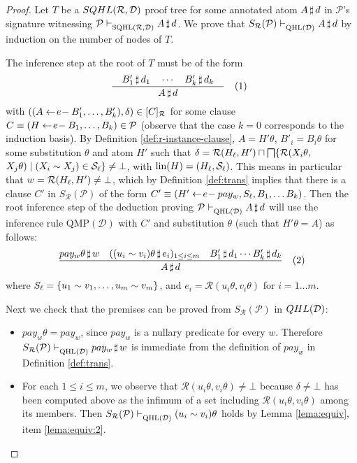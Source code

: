 \documentclass{sigplanconf}
\newcommand{\qdom}{\mathcal{D}} \newcommand{\dqdom}{D \setminus \{\bot\}} \newcommand{\bqdom}{(D \setminus \{\bot\}) \uplus \{?\}}
\newcommand{\Set}{\mathcal{S}}
\newcommand{\simrel}{\mathcal{R}}
\newcommand{\trans}[2]{S_{#1}(#2)}
\newcommand{\Prog}{\mathcal{P}} \newcommand{\UProg}{\mathcal{P_U}}
\theoremstyle{definition}
\theoremstyle{plain}
\begin{document}
\begin{proof}
Let $T$ be a $\sqhl{\simrel}{\qdom}$ proof tree for some annotated atom $A\,\sharp\,d$ in $\Prog$'s signature witnessing $\Prog \sqhlrd \at{A}{d}$. We prove that $\trans{\simrel}{\Prog} \qhld \at{A}{d}$ by induction on the number of nodes of $T$.

The inference step at the root of $T$  must be of the form
\[
    \frac
    {\quad B'_{1}\,\sharp\,d_{1} \quad \cdots \quad B'_{k}\,\sharp\,d_{k} \quad}
    {A\,\sharp\,d} \quad \mbox{(1)} \enspace
\]
with $((A \qgets{e} B'_1, \ldots, B'_k), \delta) \in [C]_\simrel$ for some clause $C \equiv (H \qgets{e} B_1, \ldots, B_k)  \in \Prog$ (observe that the case $k=0$ corresponds to the induction basis). By Definition \ref{def:r-instance-clause}, $A = H'\theta$, $B'_i= B_i\theta$ for some substitution $\theta$ and atom $H'$ such that $\delta = \simrel(\linear{H}, H') \sqcap \infi\{\simrel(X_i\theta,$ $X_j\theta) \mid (X_i \sim X_j) \in \linear{\Set}\} \neq \bot$, with $\mbox{lin}(H) = (\linear{H}, \linear{\Set})$. This means in particular that $w = \simrel(\linear{H}, H') \neq \bot$, which by Definition \ref{def:trans} implies that  there is a clause $C'$ in $\trans{\simrel}{\Prog}$ of the form $C'\equiv (H' \gets\!e\!- pay_w, S_\ell, B_1, \dots B_k)$. Then the root inference step of the deduction proving ${\Prog} \qhld \at{A}{d}$ will use the inference rule $\mbox{QMP}(\qdom)$ with $C'$ and substitution $\theta$ (such that $H'\theta = A$) as follows:
\[ \frac
    {pay_w\theta\,\sharp\,w\quad ((u_i \sim v_i)\theta\,\sharp\,e_i)_{1\leq i \leq m}\quad B'_1\,\sharp\,d_1 \cdots B'_k\,\sharp\,d_k}
    {A\,\sharp\,d }\quad \mbox{(2)}
\]
where $S_\ell = \{ u_1 \sim v_1, \dots, u_m \sim v_m \}$, and $e_i = \simrel(u_i\theta, v_i\theta)$ for $i=1 \dots m$.

Next we check that the premises can be proved from $\trans{\simrel}{\Prog}$ in $\qhl{\qdom}$:
\begin{itemize}
    \item $pay_w\theta = pay_w$, since $pay_w$ is a nullary predicate for every $w$. Therefore $\trans{\simrel}{\Prog} \qhld \at{pay_w}{w}$ is immediate from the definition of $pay_w$ in Definition \ref{def:trans}.

    \item For each $1 \le i \le m$, we observe that $\simrel(u_i\theta, v_i\theta) \neq \bot$ because $\delta \neq \bot$ has been computed above as the infimum of a set including $\simrel(u_i\theta, v_i\theta)$ among its members. Then $\trans{\simrel}{\Prog} \qhld (u_i \sim v_i)\theta$ holds by Lemma \ref{lema:equiv}, item \ref{lema:equiv:2}.


\end{itemize}
\end{proof}
\end{document}

